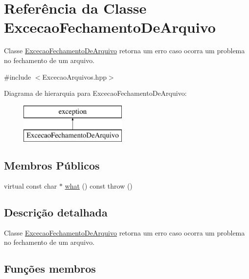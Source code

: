 \hypertarget{class_excecao_fechamento_de_arquivo}{}\section{Referência da Classe Excecao\+Fechamento\+De\+Arquivo}
\label{class_excecao_fechamento_de_arquivo}


Classe \mbox{\hyperlink{class_excecao_fechamento_de_arquivo}{Excecao\+Fechamento\+De\+Arquivo}} retorna um erro caso ocorra um problema no fechamento de um arquivo.  




{\ttfamily \#include $<$Excecao\+Arquivos.\+hpp$>$}

Diagrama de hierarquia para Excecao\+Fechamento\+De\+Arquivo\+:\begin{figure}[H]
\begin{center}
\leavevmode
\includegraphics[height=2.000000cm]{class_excecao_fechamento_de_arquivo}
\end{center}
\end{figure}
\subsection*{Membros Públicos}
\begin{DoxyCompactItemize}
\item 
virtual const char $\ast$ \mbox{\hyperlink{class_excecao_fechamento_de_arquivo_a9d9a8cdc7817549a2d270eb8b4ddd206}{what}} () const  throw ()
\end{DoxyCompactItemize}


\subsection{Descrição detalhada}
Classe \mbox{\hyperlink{class_excecao_fechamento_de_arquivo}{Excecao\+Fechamento\+De\+Arquivo}} retorna um erro caso ocorra um problema no fechamento de um arquivo. 

\subsection{Funções membros}
\mbox{\label{class_excecao_fechamento_de_arquivo_a9d9a8cdc7817549a2d270eb8b4ddd206}} 
